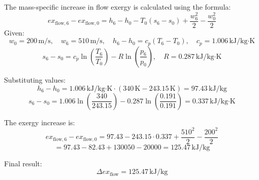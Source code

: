 The mass-specific increase in flow exergy is calculated using the formula:  
\[
ex_{\text{flow},6} - ex_{\text{flow},0} = h_6 - h_0 - T_0 (s_6 - s_0) + \frac{w_6^2}{2} - \frac{w_0^2}{2}
\]  
Given:  
\[
w_0 = 200 \, \text{m/s}, \quad w_6 = 510 \, \text{m/s}, \quad h_6 - h_0 = c_p (T_6 - T_0), \quad c_p = 1.006 \, \text{kJ}/\text{kg·K}
\]  
\[
s_6 - s_0 = c_p \ln \left( \frac{T_6}{T_0} \right) - R \ln \left( \frac{p_6}{p_0} \right), \quad R = 0.287 \, \text{kJ}/\text{kg·K}
\]  

Substituting values:  
\[
h_6 - h_0 = 1.006 \, \text{kJ}/\text{kg·K} \cdot (340 \, \text{K} - 243.15 \, \text{K}) = 97.43 \, \text{kJ}/\text{kg}
\]  
\[
s_6 - s_0 = 1.006 \ln \left( \frac{340}{243.15} \right) - 0.287 \ln \left( \frac{0.191}{0.191} \right) = 0.337 \, \text{kJ}/\text{kg·K}
\]  

The exergy increase is:  
\[
ex_{\text{flow},6} - ex_{\text{flow},0} = 97.43 - 243.15 \cdot 0.337 + \frac{510^2}{2} - \frac{200^2}{2}
\]  
\[
= 97.43 - 82.43 + 130050 - 20000 = 125.47 \, \text{kJ}/\text{kg}
\]  

Final result:  
\[
\Delta ex_{\text{flow}} = 125.47 \, \text{kJ}/\text{kg}
\]